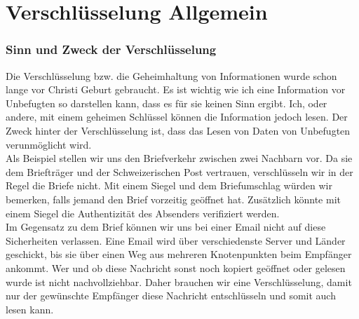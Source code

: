 \part{Verschlüsselung Allgemein}
\section{Sinn und Zweck der Verschlüsselung}
Die Verschlüsselung bzw. die Geheimhaltung von Informationen wurde schon lange vor Christi Geburt gebraucht. Es ist wichtig wie ich eine Information vor Unbefugten so darstellen kann, dass es für sie keinen Sinn ergibt. Ich, oder andere, mit einem geheimen Schlüssel können die Information jedoch lesen. Der Zweck hinter der Verschlüsselung ist, dass das Lesen von Daten von Unbefugten verunmöglicht wird. \\
Als Beispiel stellen wir uns den Briefverkehr zwischen zwei Nachbarn vor. Da sie dem Briefträger und der Schweizerischen Post vertrauen, verschlüsseln wir in der Regel die Briefe nicht. Mit einem Siegel und dem Briefumschlag würden wir bemerken, falls jemand den Brief vorzeitig geöffnet hat. Zusätzlich könnte mit einem Siegel die Authentizität des Absenders verifiziert werden.\\
Im Gegensatz zu dem Brief können wir uns bei einer Email nicht auf diese Sicherheiten verlassen. Eine Email wird über verschiedenste Server und Länder geschickt, bis sie über einen Weg aus mehreren Knotenpunkten beim Empfänger ankommt. Wer und ob diese Nachricht sonst noch kopiert geöffnet oder gelesen wurde ist nicht nachvollziehbar. Daher brauchen wir eine Verschlüsselung, damit nur der gewünschte Empfänger diese Nachricht entschlüsseln und somit auch lesen kann.
%
%
